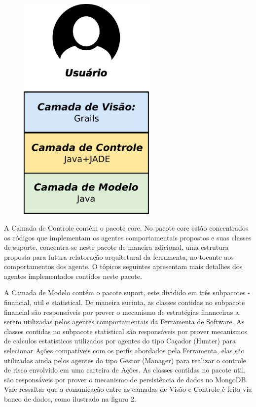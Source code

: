 \begin{apendicesenv}
\begin{figure}[h]
\centering
\label{f1}
\includegraphics[width=0.6\textwidth]{figuras/arquiteturaVisaoGeral}
\end{figure}

A Camada de Controle contém o pacote core. No pacote core estão concentrados os códigos que implementam os agentes comportamentais propostos e suas classes de suporte, concentra-se neste pacote de maneira adicional, uma estrutura proposta para futura refatoração arquitetural da ferramenta, no tocante aos comportamentos dos agente. O tópicos seguintes apresentam mais detalhes dos agentes implementados contidos neste pacote.

A Camada de Modelo contém o pacote suport, este dividido em três subpacotes - financial, util  e statistical. De maneira sucinta,  as classes  contidas no subpacote financial são responsáveis por prover o mecanismo de estratégias financeiras a serem utilizadas pelos agentes comportamentais da Ferramenta de Software. As classes contidas no subpacote statistical são responsáveis por prover mecanismos de calculos estatisticos utilizados por agentes do tipo Caçador (Hunter) para selecionar Ações  compatíveis com os perfis abordados pela Ferramenta, elas são utilizadas ainda pelos agentes do  tipo Gestor (Manager) para realizar o controle de risco envolvido em uma carteira de Ações. As classes contidas no pacote util, são responsáveis por prover o mecanismo de persistência de dados no MongoDB. Vale ressaltar que a comunicação entre as camadas de Visão e Controle é feita via banco de dados, como ilustrado na figura 2.



\end{apendicesenv}
